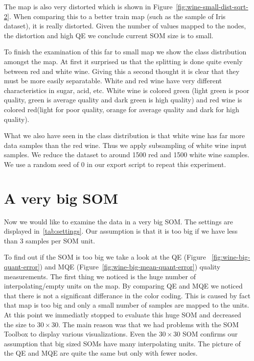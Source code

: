 \documentclass{acm_proc_article-sp}
\begin{document}
The map is also very distorted which is shown in Figure~\ref{fig:wine-small-dist-sqrt-2}.
When comparing this to a better train map (such as the sample of Iris dataset), it is
really distorted. Given the number of values mapped to the nodes, the distortion and
high QE we conclude current SOM size is to small.

To finish the examination of this far to small map we show the class distribution amongst the map.
At first it surprised us that the splitting is done quite evenly between red and
white wine. Giving this a second thought it is clear that they must be more easily separatable.
White and red wine have very different characteristics in sugar, acid, etc. 
White wine is colored green (light green is poor quality, green is average quality and dark green is high quality) and
red wine is colored red(light for poor quality, orange for average quality and dark for high quality).

What we also have seen in the class distribution is that white wine has far more data samples
than the red wine. Thus we apply subsampling of white wine input samples.
We reduce the dataset to around 1500 red and 1500 white wine samples.
We use a random seed of 0 in our export script to repeat this experiment.

\section{A very big SOM}

Now we would like to examine the data in a very big SOM. The settings are displayed
in~\ref{tab:settings}. Our assumption is that it is too big if we have less than 3
samples per SOM unit.

To find out if the SOM is too big we take a look at the QE (Figure ~\ref{fig:wine-big-quant-error}) and MQE (Figure~\ref{fig:wine-big-mean-quant-error}) quality measurements.
The first thing we noticed is the huge number of interpolating/empty units on the map. By comparing QE and MQE we noticed that there is not
a significant differance in the color coding. This is caused by fact that map is too big and only a small number of samples
are mapped to the units.
At this point we immediatly stopped to evaluate this huge SOM and decreased the size to $30\times30$. The main reason was that we had problems
with the SOM Toolbox to display various visualizations. Even the $30\times30$ SOM confirms our assumption that big sized SOMs have
many interpolating units. The picture of the QE and MQE are quite the same but only with fewer nodes.
\end{document}
